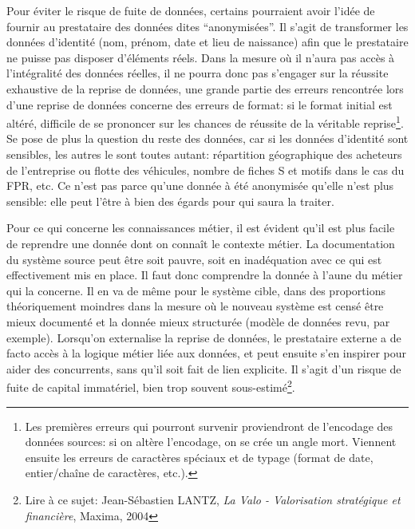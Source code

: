 \documentclass{book}
\begin{document}
Pour éviter le risque de fuite de données, certains pourraient avoir l'idée de fournir au prestataire des données dites ``anonymisées''. Il s'agit de transformer les données d'identité (nom, prénom, date et lieu de naissance) afin que le prestataire ne puisse pas disposer d'éléments réels. Dans la mesure où il n'aura pas accès à l'intégralité des données réelles, il ne pourra donc pas s'engager sur la réussite exhaustive de la reprise de données, une grande partie des erreurs rencontrée lors d'une reprise de données concerne des erreurs de format: si le format initial est altéré, difficile de se prononcer sur les chances de réussite de la véritable reprise\footnote{Les premières erreurs qui pourront survenir proviendront de l'encodage des données sources: si on altère l'encodage, on se crée un angle mort. Viennent ensuite les erreurs de caractères spéciaux et de typage (format de date, entier/chaîne de caractères, etc.).}. Se pose de plus la question du reste des données, car si les données d'identité sont sensibles, les autres le sont toutes autant: répartition géographique des acheteurs de l'entreprise ou flotte des véhicules, nombre de fiches S et motifs dans le cas du FPR, etc. Ce n'est pas parce qu'une donnée à été anonymisée qu'elle n'est plus sensible: elle peut l'être à bien des égards pour qui saura la traiter.

Pour ce qui concerne les connaissances métier, il est évident qu'il est plus facile de reprendre une donnée dont on connaît le contexte métier. La documentation du système source peut être soit pauvre, soit en inadéquation avec ce qui est effectivement mis en place. Il faut donc comprendre la donnée à l'aune du métier qui la concerne. Il en va de même pour le système cible, dans des proportions théoriquement moindres dans la mesure où le nouveau système est censé être mieux documenté et la donnée mieux structurée (modèle de données revu, par exemple). Lorsqu'on externalise la reprise de données, le prestataire externe a de facto accès à la logique métier liée aux données, et peut ensuite s'en inspirer pour aider des concurrents, sans qu'il soit fait de lien explicite. Il s'agit d'un risque de fuite de capital immatériel, bien trop souvent sous-estimé\footnote{Lire à ce sujet: Jean-Sébastien LANTZ, \textit{La Valo - Valorisation stratégique et financière}, Maxima, 2004}.
\end{document}
